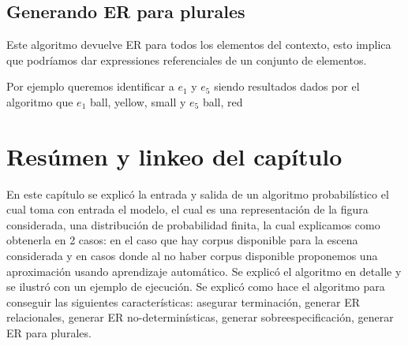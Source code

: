 \subsection{Generando ER para plurales}

Este algoritmo devuelve ER para todos los elementos del contexto, 
esto implica que podr\'iamos dar expressiones referenciales de un conjunto de elementos.

Por ejemplo queremos identificar a $e_1$ y $e_5$ 
siendo resultados dados por el algoritmo que $e_1$
ball, yellow, small
y $e_5$ ball, red


\section{Res\'umen y linkeo del cap\'itulo}
\label{sec:link-algoritmo}

En este cap\'itulo se explic\'o la entrada y salida de un algoritmo probabil\'istico el cual toma con entrada el modelo, el cual es una representaci\'on de la figura considerada, una distribuci\'on de probabilidad finita, la cual explicamos como obtenerla en 2 casos: en el caso que hay corpus disponible para la escena considerada y en casos donde al no haber corpus disponible proponemos una aproximaci\'on usando aprendizaje autom\'atico. Se explic\'o el algoritmo en detalle y se ilustr\'o con un ejemplo de ejecuci\'on. Se explic\'o como hace el algoritmo para conseguir las siguientes caracter\'isticas: asegurar terminaci\'on, generar ER relacionales, generar ER no-determin\'isticas, generar sobreespecificaci\'on, generar ER para plurales.

